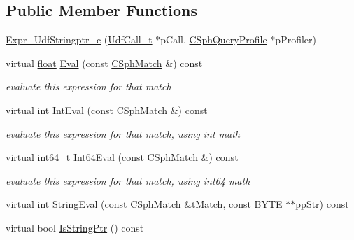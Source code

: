 \subsection*{Public Member Functions}
\begin{DoxyCompactItemize}
\item 
\hyperlink{classExpr__UdfStringptr__c_a259c0f78d8c17bf8390e4eb6131b1416}{Expr\-\_\-\-Udf\-Stringptr\-\_\-c} (\hyperlink{structUdfCall__t}{Udf\-Call\-\_\-t} $\ast$p\-Call, \hyperlink{classCSphQueryProfile}{C\-Sph\-Query\-Profile} $\ast$p\-Profiler)
\item 
virtual \hyperlink{sphinxexpr_8cpp_a0e0d0739f7035f18f949c2db2c6759ec}{float} \hyperlink{classExpr__UdfStringptr__c_a5f6378470612401c462d4c51dc88fc3d}{Eval} (const \hyperlink{classCSphMatch}{C\-Sph\-Match} \&) const 
\begin{DoxyCompactList}\small\item\em evaluate this expression for that match \end{DoxyCompactList}\item 
virtual \hyperlink{sphinxexpr_8cpp_a4a26e8f9cb8b736e0c4cbf4d16de985e}{int} \hyperlink{classExpr__UdfStringptr__c_a1e416fad74e3f1d5b20c7fcafd9ec897}{Int\-Eval} (const \hyperlink{classCSphMatch}{C\-Sph\-Match} \&) const 
\begin{DoxyCompactList}\small\item\em evaluate this expression for that match, using int math \end{DoxyCompactList}\item 
virtual \hyperlink{sphinxstd_8h_a996e72f71b11a5bb8b3b7b6936b1516d}{int64\-\_\-t} \hyperlink{classExpr__UdfStringptr__c_a5b92be33c203d0054abb0bcdbc680f84}{Int64\-Eval} (const \hyperlink{classCSphMatch}{C\-Sph\-Match} \&) const 
\begin{DoxyCompactList}\small\item\em evaluate this expression for that match, using int64 math \end{DoxyCompactList}\item 
virtual \hyperlink{sphinxexpr_8cpp_a4a26e8f9cb8b736e0c4cbf4d16de985e}{int} \hyperlink{classExpr__UdfStringptr__c_a9a564f0784c210d379da1e15fc3d0365}{String\-Eval} (const \hyperlink{classCSphMatch}{C\-Sph\-Match} \&t\-Match, const \hyperlink{sphinxstd_8h_a4ae1dab0fb4b072a66584546209e7d58}{B\-Y\-T\-E} $\ast$$\ast$pp\-Str) const 
\item 
virtual bool \hyperlink{classExpr__UdfStringptr__c_a533afb794aa9757928a0c119d8cadacd}{Is\-String\-Ptr} () const 
\end{DoxyCompactItemize}
